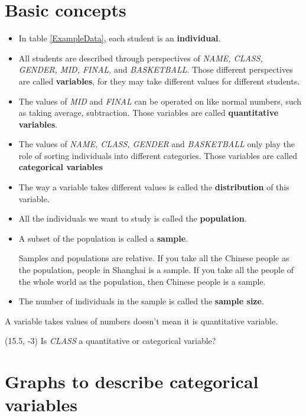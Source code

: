 \documentclass[a4paper, 12pt,twoside]{book}
\begin{document}
\section{Basic concepts}
\begin{itemize}
\item In  table \ref{ExampleData}, each student is an \textbf{individual}.
\item All students are described through perspectives of \textit{NAME, CLASS, GENDER, MID, FINAL,} and \textit{BASKETBALL}. Those different perspectives are called \textbf{variables}, for they may take different values for different students.
\item The values of \textit{MID} and \textit{FINAL} can be operated on like normal numbers, such as taking average, subtraction. Those variables are called 
\textbf{quantitative variables}.
\item The values of \textit{NAME, CLASS, GENDER} and \textit{BASKETBALL} only play the role of sorting individuals into different categories. Those variables are called \textbf{categorical variables}
\item The way a variable takes different values is called the \textbf{distribution} of this variable.
\item All the individuals we want to study is called the \textbf{population}.
\item A subset of the population is called a \textbf{sample}.

\colorbox{babypink}{Samples and populations are relative.} If you take all the Chinese people as the population, people in Shanghai is a sample. If you take all the people of the whole world as the population, then Chinese people is a sample.
\item The number of individuals in the sample is called the \textbf{sample size}.

\end{itemize}

\colorbox{babypink}{\parbox{14.2cm}{A variable takes values of numbers doesn't mean it is quantitative variable. }}

\begin{textblock}{3}(15.5, -3)
Is \textit{CLASS} a quantitative or categorical variable?
\end{textblock}
\vspace{0.6cm}
\newpage

\section{Graphs to describe categorical variables}
\end{document}
